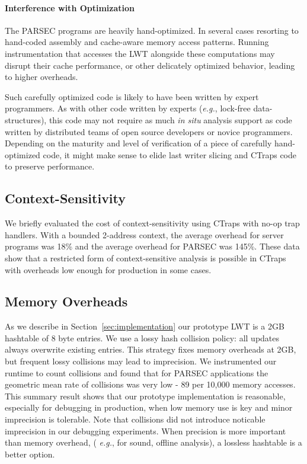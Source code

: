 \documentclass[preprint,9pt]{sigplanconf}
\newcommand{\ctraps}{CTraps\xspace}
\newcommand{\lwt}{LWT\xspace}
\begin{document}
\paragraph{Interference with Optimization}
The PARSEC programs are heavily hand-optimized. In several cases
resorting to hand-coded assembly and cache-aware memory access patterns.
Running instrumentation that accesses the \lwt alongside these computations may
disrupt their cache performance, or other delicately optimized behavior,
leading to higher overheads.  

Such carefully optimized code is likely to have been written by expert
programmers.  As with other code written by experts ({\em e.g.}, lock-free
data-structures), this code may not require as much {\em in situ} analysis
support as code written by distributed teams of open source developers or
novice programmers.  Depending on the maturity and level of verification of a
piece of carefully hand-optimized code, it might make sense to elide 
last writer slicing and \ctraps code to preserve performance. 
 

\subsection{Context-Sensitivity}
We briefly evaluated the cost of context-sensitivity using \ctraps with no-op
trap handlers.  With a bounded 2-address context, the average overhead for
server programs was 18\% and the average overhead for PARSEC was 145\%.  These
data show that a restricted form of context-sensitive analysis is possible in
\ctraps with overheads low enough for production in some cases.

\subsection{Memory Overheads}
\label{sec:eval:performance:collisions}
As we describe in Section~\ref{sec:implementation} our prototype \lwt is a 2GB
hashtable of 8 byte entries.  We use a lossy hash collision policy: all updates
always overwrite existing entries.  This strategy fixes memory overheads at
2GB, but frequent lossy collisions may lead to imprecision.   We instrumented
our runtime to count collisions and found that for PARSEC applications the
geometric mean rate of collisions was very low - 89 per 10,000 memory accesses.
This summary result shows that our prototype implementation is reasonable,
especially for debugging in production, when low memory use is key and minor
imprecision is tolerable.  Note that collisions did not introduce noticable
imprecision in our debugging experiments.  When precision is more important than memory overhead, ({\em
e.g.}, for sound, offline analysis), a lossless hashtable is a better option.  
\end{document}
